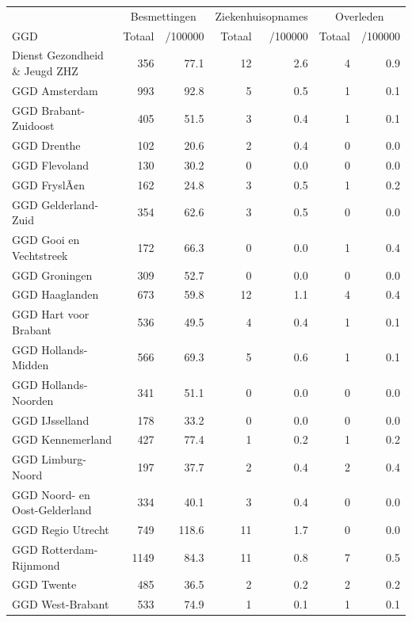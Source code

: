 \documentclass[
  english,
  man,floatsintext]{apa6}
\begin{document}
\begin{table}
\centering\begingroup\fontsize{10}{12}\selectfont

\begin{threeparttable}
\begin{tabular}{lrrrrrr}
\toprule
\multicolumn{1}{c}{ } & \multicolumn{2}{c}{Besmettingen} & \multicolumn{2}{c}{Ziekenhuisopnames} & \multicolumn{2}{c}{Overleden} \\
\cmidrule(l{3pt}r{3pt}){2-3} \cmidrule(l{3pt}r{3pt}){4-5} \cmidrule(l{3pt}r{3pt}){6-7}
GGD & Totaal & /100000 & Totaal & /100000 & Totaal & /100000\\
\midrule
Dienst Gezondheid \& Jeugd ZHZ & 356 & 77.1 & 12 & 2.6 & 4 & 0.9\\
GGD Amsterdam & 993 & 92.8 & 5 & 0.5 & 1 & 0.1\\
GGD Brabant-Zuidoost & 405 & 51.5 & 3 & 0.4 & 1 & 0.1\\
GGD Drenthe & 102 & 20.6 & 2 & 0.4 & 0 & 0.0\\
GGD Flevoland & 130 & 30.2 & 0 & 0.0 & 0 & 0.0\\
GGD FryslÃ¢n & 162 & 24.8 & 3 & 0.5 & 1 & 0.2\\
GGD Gelderland-Zuid & 354 & 62.6 & 3 & 0.5 & 0 & 0.0\\
GGD Gooi en Vechtstreek & 172 & 66.3 & 0 & 0.0 & 1 & 0.4\\
GGD Groningen & 309 & 52.7 & 0 & 0.0 & 0 & 0.0\\
GGD Haaglanden & 673 & 59.8 & 12 & 1.1 & 4 & 0.4\\
GGD Hart voor Brabant & 536 & 49.5 & 4 & 0.4 & 1 & 0.1\\
GGD Hollands-Midden & 566 & 69.3 & 5 & 0.6 & 1 & 0.1\\
GGD Hollands-Noorden & 341 & 51.1 & 0 & 0.0 & 0 & 0.0\\
GGD IJsselland & 178 & 33.2 & 0 & 0.0 & 0 & 0.0\\
GGD Kennemerland & 427 & 77.4 & 1 & 0.2 & 1 & 0.2\\
GGD Limburg-Noord & 197 & 37.7 & 2 & 0.4 & 2 & 0.4\\
GGD Noord- en Oost-Gelderland & 334 & 40.1 & 3 & 0.4 & 0 & 0.0\\
GGD Regio Utrecht & 749 & 118.6 & 11 & 1.7 & 0 & 0.0\\
GGD Rotterdam-Rijnmond & 1149 & 84.3 & 11 & 0.8 & 7 & 0.5\\
GGD Twente & 485 & 36.5 & 2 & 0.2 & 2 & 0.2\\
GGD West-Brabant & 533 & 74.9 & 1 & 0.1 & 1 & 0.1\\

\end{tabular}
\end{threeparttable}
\end{table}
\end{document}
